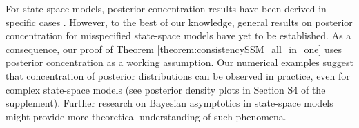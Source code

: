 \documentclass[12pt]{article}
\theoremstyle{plain}
\theoremstyle{definition}
\newcommand{\suppdensityplots}{ S4 }
\begin{document}
	For state-space models, posterior concentration results have been derived in specific
	cases \citep[e.g.][and references
	therein]{lijoi2007bayesian,de2008asymptotic,shalizi2009dynamics,gassiat2014posterior,douc:moulines:stoffer2014,douc:olsson:roueff}.
	However, to the best of our knowledge, general results on posterior
	concentration for misspecified state-space models have yet to be
	established. As a consequence, our proof of Theorem \ref{theorem:consistencySSM_all_in_one} uses posterior concentration as a working
	assumption. Our numerical examples
	suggest that concentration of posterior distributions can be observed in practice, even for complex state-space models (see posterior density plots in Section\suppdensityplots of the supplement). 
	Further research on Bayesian asymptotics in state-space models might provide more theoretical understanding of such phenomena.
	
\end{document}
